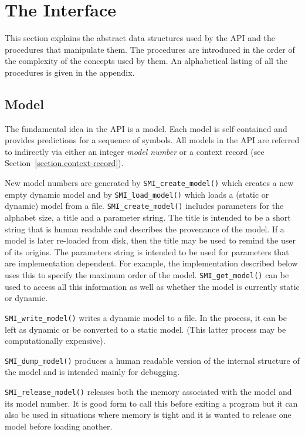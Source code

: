 \documentclass[11pt]{article}
\begin{document}
\section{The Interface}

\label{section.interface}

This section explains the abstract data structures used by the API and the
procedures that manipulate them. The procedures are introduced in the order
of the complexity of the concepts used by them. An alphabetical listing of
all the procedures is given in the appendix.

\subsection{Model}

The fundamental idea in the API is a model. Each model is self-contained and
provides predictions for a sequence of symbols. All models in the API are
referred to indirectly via either an integer \emph{model number} or a context
record (see Section~\ref{section.context-record}).

New model numbers are generated by \verb|SMI_create_model()| which creates
a new empty dynamic model and by \verb|SMI_load_model()| which loads a
(static or dynamic) model from a file. \verb|SMI_create_model()| includes
parameters for the alphabet size, a title and a parameter string. The title
is intended to be a short string that is human readable and describes the
provenance of the model. If a model is later re-loaded from disk, then the
title may be used to remind the user of its origins. The parameters string
is intended to be used for parameters that are implementation dependent. For
example, the implementation described below uses this to specify the maximum
order of the model. \verb|SMI_get_model()| can be used to access all this
information as well as whether the model is currently static or dynamic.

\verb|SMI_write_model()| writes a dynamic model to a file. In the process,
it can be left as dynamic or be converted to a static model. (This latter
process may be computationally expensive).

\verb|SMI_dump_model()| produces a human readable version of the internal
structure of the model and is intended mainly for debugging.

\verb|SMI_release_model()| releases both the memory associated with the
model and its model number. It is good form to call this before exiting a
program but it can also be used in situations where memory is tight and it
is wanted to release one model before loading another.
\end{document}
